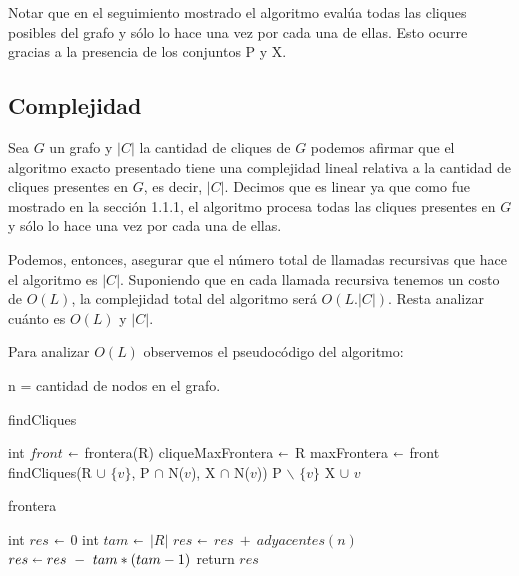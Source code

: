 Notar que en el seguimiento mostrado el algoritmo evalúa todas las cliques posibles del grafo y sólo lo hace una vez por cada una de ellas. Esto ocurre gracias a la presencia de los conjuntos P y X.

\subsection{Complejidad}

Sea $G$ un grafo y $|C|$ la cantidad de cliques de $G$ podemos afirmar que el algoritmo exacto presentado tiene una complejidad lineal relativa a la cantidad de cliques presentes en $G$, es decir, $|C|$. Decimos que es linear ya que como fue mostrado en la sección 1.1.1, el algoritmo procesa todas las cliques presentes en $G$ y sólo lo hace una vez por cada una de ellas.

Podemos, entonces, asegurar que el número total de llamadas recursivas que hace el algoritmo es $|C|$. Suponiendo que en cada llamada recursiva tenemos un costo de $O(L)$, la complejidad total del algoritmo será $O(L.|C|)$. Resta analizar cuánto es $O(L)$ y $|C|$.

Para analizar $O(L)$ observemos el pseudocódigo del algoritmo:

n = cantidad de nodos en el grafo.

\begin{algorithm}[H]
\caption{findCliques}\label{ej1}
\begin{algorithmic}[1]
	\State int $front$ $\shortleftarrow$ frontera(R) 
		\State cliqueMaxFrontera $\shortleftarrow$ R 
		\State maxFrontera $\shortleftarrow$ front 
	\EndIf
		\State findCliques(R $\cup$ $\{v\}$, P $\cap$ N($v$), X $\cap$ N($v$))  
	\EndFor
	\State P $\backslash$ $\{v\}$ 
	\State X $\cup$ $v$ 
\EndProcedure
\end{algorithmic}
\end{algorithm}

\begin{algorithm}[H]
\caption{frontera}\label{ej1}
\begin{algorithmic}[1]
	\State int $res$ $\shortleftarrow$ 0 
	\State int $tam$ $\shortleftarrow$ $|R|$ 
	 
		\State $res$ $\shortleftarrow$ $res \ + \ adyacentes(n)$ 
	\EndFor
	\State $res \shortleftarrow res \ - \ tam*(tam-1)$ 
	\State return $res$ 
\EndProcedure
\end{algorithmic}
\end{algorithm}

